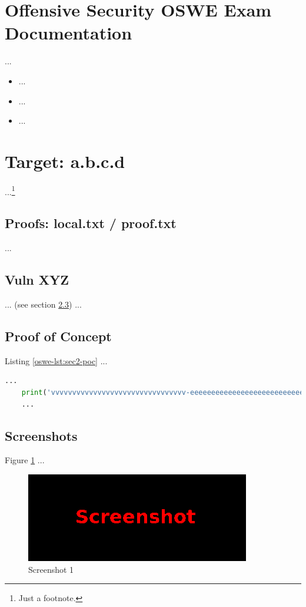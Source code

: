 %
%
%
\section{Offensive Security OSWE Exam Documentation}\label{oswe-sec:sec1}
%
...

\begin{itemize}
    \item ...
    \item ...
    \item ...
\end{itemize}
%
%
%
\section{Target: a.b.c.d}\label{oswe-sec:sec2}
%
...\footnote{Just a footnote.}
%
%
%
\subsection{Proofs: local.txt / proof.txt}\label{oswe-sec:sec2-proofs}
%
...~\cite{MitreAttack}
%
%
%
\subsection{Vuln XYZ}\label{oswe-sec:sec2-vuln}
%
... (see section \ref{oswe-sec:sec2-poc}) ...

%
%
%
\subsection{Proof of Concept}\label{oswe-sec:sec2-poc}
%
Listing \ref{oswe-lst:sec2-poc} ...\\

\begin{lstlisting}[language=Python,caption={Proof of Concept}, label={oswe-lst:sec2-poc}]
    ...
    print('vvvvvvvvvvvvvvvvvvvvvvvvvvvvvvvv-eeeeeeeeeeeeeeeeeeeeeeeeeeeeeeeeeeeeeeeeeee-looooooooooooooooooooooong-striiiiiiiiiiiiiing')
    ...
\end{lstlisting}
%
%
%
\subsection{Screenshots}\label{oswe-sec:sec2-screens}
%
Figure \ref{oswe-fig:sec2-screen1} ...

\begin{figure}[H]
    \centering
    \includegraphics[width=\textwidth]{img/assignment1/screen1.png}
    \caption{Screenshot 1}\label{oswe-fig:sec2-screen1}
\end{figure}
%
%
%
